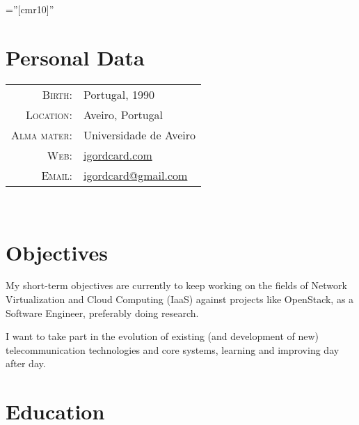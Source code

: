 \documentclass[a4paper,10pt]{article} %
\begin{document}
\pagestyle{empty} %

\font\fb=''[cmr10]'' %



\par{\bigskip\par} %

\section{Personal Data}

\begin{tabular}{rl}
\textsc{Birth:} & Portugal, 1990 \\
\textsc{Location:} & Aveiro, Portugal \\
\textsc{Alma mater:} & Universidade de Aveiro\\
\textsc{Web:} & \href{http://igordcard.com}{igordcard.com}\\
\textsc{Email:} & \href{mailto:igordcard+cv@gmail.com}{igordcard@gmail.com}\\
\end{tabular} \\


\section{Objectives}

My short-term objectives are currently to keep working on the fields of Network Virtualization and Cloud Computing (IaaS) against projects like OpenStack, as a Software Engineer, preferably doing research.

I want to take part in the evolution of existing (and development of new) telecommunication technologies 
and core systems, learning and improving day after day. \\



\section{Education}
\end{document}
